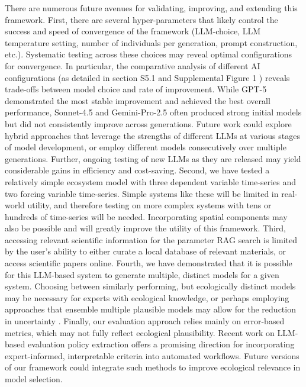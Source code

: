 There are numerous future avenues for validating, improving, and extending this framework. First, there are several hyper-parameters that likely control the success and speed of convergence of the framework (LLM-choice, LLM temperature setting, number of individuals per generation, prompt construction, etc.). Systematic testing across these choices may reveal optimal configurations for convergence. In particular, the comparative analysis of different AI configurations (as detailed in section S5.1 %
and Supplemental Figure 1%
) reveals trade-offs between model choice and rate of improvement. While GPT-5 demonstrated the most stable improvement and achieved the best overall performance, Sonnet-4.5 and Gemini-Pro-2.5 often produced strong initial models but did not consistently improve across generations. Future work could explore hybrid approaches that leverage the strengths of different LLMs at various stages of model development, or employ different models consecutively over multiple generations. Further, ongoing testing of new LLMs as they are released may yield considerable gains in efficiency and cost-saving. Second, we have tested a relatively simple ecosystem model with three dependent variable time-series and two forcing variable time-series. Simple systems like these will be limited in real-world utility, and therefore testing on more complex systems with tens or hundreds of time-series will be needed. Incorporating spatial components may also be possible and will greatly improve the utility of this framework. Third, accessing relevant scientific information for the parameter RAG search is limited by the user's ability to either curate a local database of relevant materials, or access scientific papers online. Fourth, we have demonstrated that it is possible for this LLM-based system to generate multiple, distinct models for a given system. Choosing between similarly performing, but ecologically distinct models may be necessary for experts with ecological knowledge, or perhaps employing approaches that ensemble multiple plausible models may allow for the reduction in uncertainty \citep{baker2017ensemble,gaardmark2013biological,vollert2024unlocking}. Finally, our evaluation approach relies mainly on error-based metrics, which may not fully reflect ecological plausibility. Recent work on LLM-based evaluation policy extraction \citep{cheng2025llm} offers a promising direction for incorporating expert-informed, interpretable criteria into automated workflows. Future versions of our framework could integrate such methods to improve ecological relevance in model selection.

